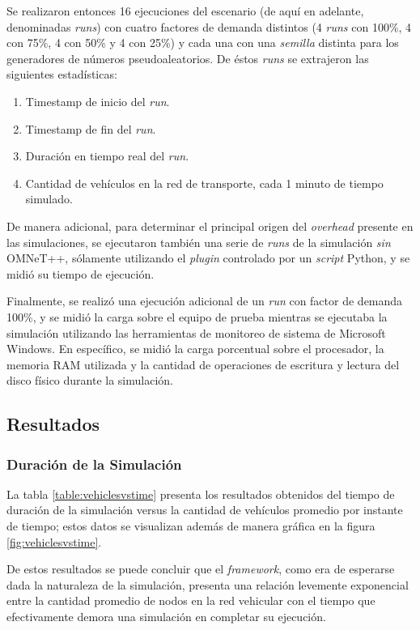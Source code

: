 Se realizaron entonces 16 ejecuciones del escenario (de aquí en adelante, denominadas \emph{runs}) con cuatro factores de demanda distintos (4 \emph{runs} con 100\%, 4 con 75\%, 4 con 50\% y 4 con 25\%) y cada una con una \emph{semilla} distinta para los generadores de números pseudoaleatorios. De éstos \emph{runs} se extrajeron las siguientes estadísticas:

\begin{enumerate}
    \item Timestamp de inicio del \emph{run}.
    \item Timestamp de fin del \emph{run}.
    \item Duración en tiempo real del \emph{run}.
    \item Cantidad de vehículos en la red de transporte, cada 1 minuto de tiempo simulado.
\end{enumerate}

De manera adicional, para determinar el principal origen del \emph{overhead} presente en las simulaciones, se ejecutaron también una serie de \emph{runs} de la simulación \emph{sin} OMNeT++, sólamente utilizando el \emph{plugin} controlado por un \emph{script} Python, y se midió su tiempo de ejecución.

Finalmente, se realizó una ejecución adicional de un \emph{run} con factor de demanda 100\%, y se midió la carga sobre el equipo de prueba mientras se ejecutaba la simulación utilizando las herramientas de monitoreo de sistema de Microsoft Windows. En específico, se midió la carga porcentual sobre el procesador, la memoria RAM utilizada y la cantidad de operaciones de escritura y lectura del disco físico durante la simulación.

\subsection{Resultados}

\subsubsection{Duración de la Simulación}

La tabla \ref{table:vehiclesvstime} presenta los resultados obtenidos del tiempo de duración de la simulación versus la cantidad de vehículos promedio por instante de tiempo; estos datos se visualizan además de manera gráfica en la figura \ref{fig:vehiclesvstime}.

De estos resultados se puede concluir que el \emph{framework}, como era de esperarse dada la naturaleza de la simulación, presenta una relación levemente exponencial entre la cantidad promedio de nodos en la red vehicular con el tiempo que efectivamente demora una simulación en completar su ejecución.

